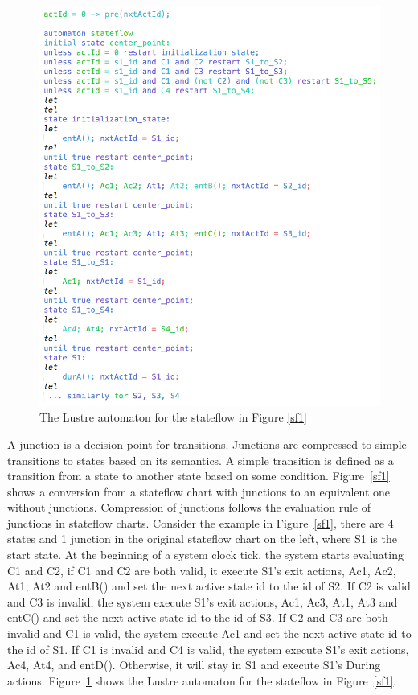 \documentclass{article}
\begin{document}
\begin{figure}[h]
\begin{center}
  \includegraphics[scale=0.3]{figures/automaton} 
\end{center}  
  \caption{The Lustre automaton for the stateflow in Figure \ref{sf1}}
  \label{automaton}
\end{figure}

A junction is a decision point for transitions. 
Junctions are compressed to simple transitions to states based on its semantics. 
A simple transition is defined as a transition from a state to another state based on some condition. 
Figure~\ref{sf1} shows a conversion from a stateflow chart with junctions to an equivalent one without junctions.
Compression of junctions follows the evaluation rule of junctions in stateflow charts.
Consider the example in Figure~\ref{sf1}, there are 4 states and 1 junction in the original stateflow chart on the left, where S1 is the start state.
At the beginning of a system clock tick, the system starts evaluating C1 and C2, if C1 and C2 are both valid, it execute S1's exit actions, Ac1, Ac2, At1, At2 and entB() and set the next active state id to the id of S2. 
If C2 is valid and C3 is invalid, the system execute S1's exit actions, Ac1, Ac3, At1, At3 and entC() and set the next active state id to the id of S3.
If C2 and C3 are both invalid and C1 is valid, the system execute Ac1 and set the next active state id to the id of S1.
If C1 is invalid and C4 is valid, the system execute S1's exit actions, Ac4, At4, and entD().  
Otherwise, it will stay in S1 and execute S1's During actions. 
Figure~\ref{automaton} shows the Lustre automaton for the stateflow in Figure~\ref{sf1}.
\end{document}
